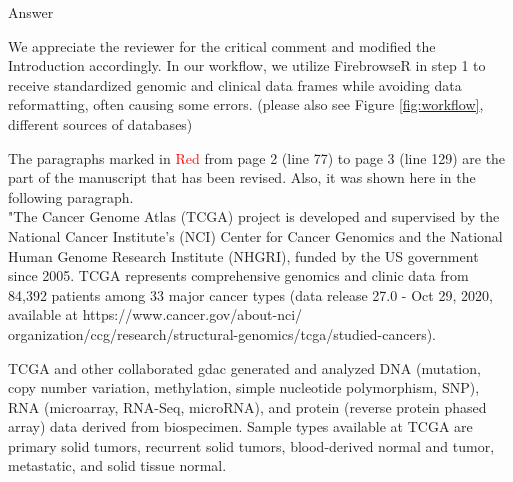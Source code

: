 \documentclass[preprint,12pt]{elsarticle}
\newenvironment{MyColorPar}[1]{%
    \leavevmode\color{#1}\ignorespaces%
}{%
}%
\begin{document}
\begin{MyColorPar}{blue}
Answer

We appreciate the reviewer for the critical comment and modified the Introduction accordingly.
In our workflow, we utilize FirebrowseR in step 1 to receive standardized genomic and clinical data frames while avoiding data reformatting, often causing some errors. (please also see Figure \ref{fig:workflow}, different sources of databases)

The paragraphs marked in \textcolor{red}{Red} from page 2 (line 77) to page 3 (line 129) are the part of the manuscript that has been revised. Also, it was shown here in the following paragraph.
\\[0.3cm]





"The Cancer Genome Atlas (TCGA) project\cite{Weinstein2013} is developed and supervised by the National Cancer Institute's (NCI) Center for Cancer Genomics and the National Human Genome Research Institute (NHGRI), funded by the US government since 2005.
TCGA represents comprehensive genomics and clinic data from 84,392 patients among 33 major cancer types (data release 27.0 - Oct 29, 2020, available at https://www.cancer.gov/about-nci/\\organization/ccg/research/structural-genomics/tcga/studied-cancers).

TCGA and other collaborated \acrfull{gdac} generated and analyzed DNA (mutation, copy number variation, methylation, simple nucleotide polymorphism, SNP), RNA (microarray, RNA-Seq, microRNA), and protein (reverse protein phased array) data derived from biospecimen. Sample types available at TCGA are primary solid tumors, recurrent solid tumors, blood-derived normal and tumor, metastatic, and solid tissue normal.  


\end{MyColorPar}
\end{document}

